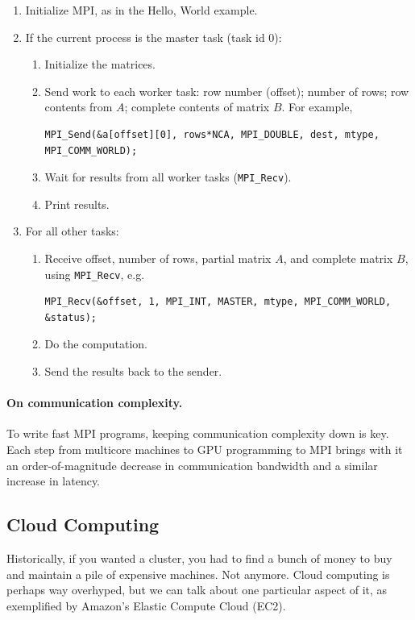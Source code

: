 \documentclass[a4paper]{report}
\begin{document}
\begin{enumerate}
\item Initialize MPI, as in the Hello, World example.
\item If the current process is the master task (task id 0):
\begin{enumerate}
\item Initialize the matrices.
\item Send work to each worker task: row number (offset); number of rows;
row contents from $A$; complete contents of matrix $B$. For example,

{\scriptsize
\begin{verbatim}
MPI_Send(&a[offset][0], rows*NCA, MPI_DOUBLE, dest, mtype, MPI_COMM_WORLD);
\end{verbatim}
}

\item Wait for results from all worker tasks (\verb+MPI_Recv+).
\item Print results.
\end{enumerate}
\item For all other tasks:
\begin{enumerate}
\item Receive offset, number of rows, partial matrix $A$, and complete matrix $B$, using {\tt MPI\_Recv}, e.g.

{\scriptsize
\begin{verbatim}
MPI_Recv(&offset, 1, MPI_INT, MASTER, mtype, MPI_COMM_WORLD, &status);
\end{verbatim}
}
\item Do the computation.
\item Send the results back to the sender.
\end{enumerate}
\end{enumerate}

\paragraph{On communication complexity.} To write fast MPI programs,
keeping communication complexity down is key. Each step from multicore
machines to GPU programming to MPI brings with it an
order-of-magnitude decrease in communication bandwidth and a similar
increase in latency.

\subsection*{Cloud Computing}
Historically, if you wanted a cluster, you had to find a bunch of
money to buy and maintain a pile of expensive machines. Not anymore.
Cloud computing is perhaps way overhyped, but we can talk about 
one particular aspect of it, as exemplified by Amazon's Elastic
Compute Cloud (EC2).
\end{document}

